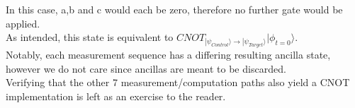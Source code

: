 In this case, a,b and c would each be zero, therefore no further gate would be applied.\\
As intended, this state is equivalent to 
$CNOT_{|\psi_{Control}\rangle\rightarrow |\psi_{Target}\rangle} |\phi_{t=0}\rangle$.
\\
Notably, each measurement sequence has a differing resulting ancilla state, 
however we do not care since ancillas are meant to be discarded.
\\
Verifying that the other 7 measurement/computation paths also yield a CNOT implementation
is left as an exercise to the reader.
\newpage